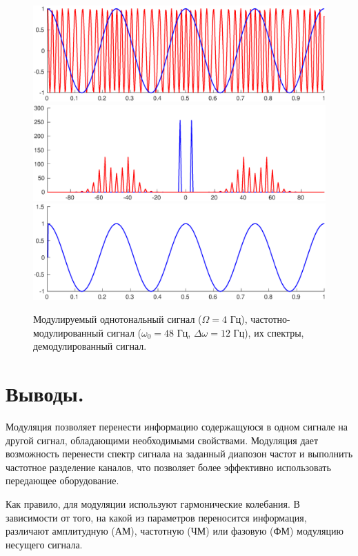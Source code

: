 \documentclass[a4paper,14pt]{extarticle}
\begin{document}
\begin{figure}[p]
\centering
\includegraphics[width=1\textwidth]{fmod.eps}
\includegraphics[width=1\textwidth]{fmod_s.eps}
\includegraphics[width=1\textwidth]{fdemod.eps}
\captionsetup{justification=centering,margin=0.5cm}
\caption{Модулируемый однотональный сигнал ($\Omega = 4$ Гц), частотно-модулированный сигнал ($\omega_0 = 48$ Гц, $\Delta \omega = 12$ Гц), их спектры, демодулированный сигнал.}
\label{fm}
\end{figure}

\section{Выводы.}

Модуляция позволяет перенести информацию содержащуюся в одном сигнале на другой сигнал, обладающими необходимыми свойствами. Модуляция дает возможность перенести спектр сигнала на заданный диапозон частот и выполнить частотное разделение каналов, что позволяет более эффективно использовать передающее оборудование.

Как правило, для модуляции используют гармонические колебания. В зависимости от того, на какой из параметров переносится информация, различают амплитудную (АМ), частотную (ЧМ) или фазовую (ФМ) модуляцию несущего сигнала.
\end{document}

